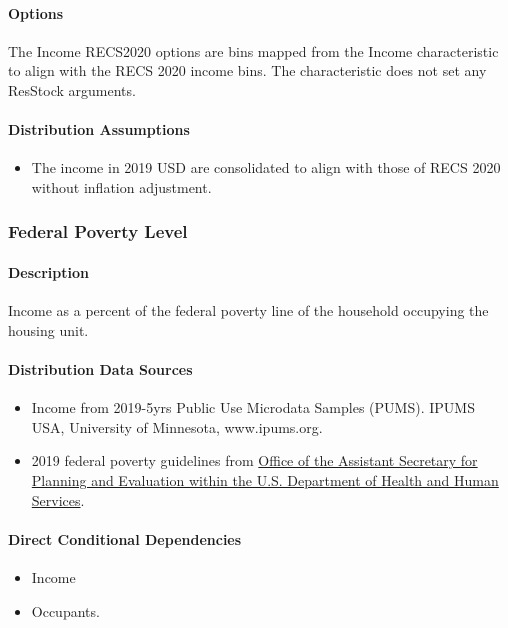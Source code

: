 \paragraph{Options}
The Income RECS2020 options are bins mapped from the Income characteristic to align with the RECS 2020 income bins. The characteristic does not set any ResStock arguments.

\paragraph{Distribution Assumptions}
\begin{itemize}
\item
  The income in 2019 USD are consolidated to align with those of RECS 2020 without inflation adjustment.
\end{itemize}

\subsubsection{Federal Poverty Level}\label{federal_poverty_level}
\paragraph{Description}
Income as a percent of the federal poverty line of the household occupying the housing unit.

\paragraph{Distribution Data Sources}
\begin{itemize}
\item
  Income from 2019-5yrs Public Use Microdata Samples (PUMS). IPUMS USA, University of Minnesota, www.ipums.org.
\item
  2019 federal poverty guidelines from \href{https://aspe.hhs.gov/topics/poverty-economic-mobility/poverty-guidelines/prior-hhs-poverty-guidelines-federal-register-references/2019-poverty-guidelines}{Office of the Assistant Secretary for Planning and Evaluation within the U.S. Department of Health and Human Services}.
\end{itemize}

\paragraph{Direct Conditional Dependencies}
\begin{itemize}
    \item Income
    \item Occupants.
\end{itemize}

